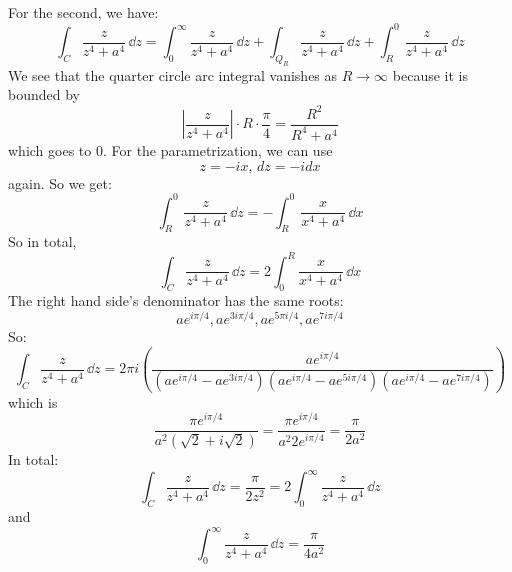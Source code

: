 \documentclass{article}
\begin{document}
\begin{answer}
            For the second, we have:
                \begin{equation*}
                    \int_{C}^{} \dfrac{z}{z^{4} + a^{4}} \, \dd{z} = \int_{0}^{\infty} \dfrac{z}{z^{4} + a^{4}} \, \dd{z}  + \int_{Q_{R}}^{} \dfrac{z}{z^{4} + a^{4}} \, \dd{z}  + \int_{R}^{0} \dfrac{z}{z^{4} + a^{4}} \, \dd{z} 
                \end{equation*}
            We see that the quarter circle arc integral vanishes as $R \rightarrow\infty$ because it is bounded by
                \begin{equation*}
                    \left\lvert \dfrac{z}{z^{4} + a^{4}} \right\rvert \cdot R \cdot \dfrac{\pi}{4} = \dfrac{R^{2}}{R^{4} + a^{4}}
                \end{equation*}
            which goes to $0$. For the parametrization, we can use
                \begin{equation*}
                    z = -ix, \, dz = -id x
                \end{equation*}
            again. So we get:
                \begin{equation*}
                    \int_{R}^{0} \dfrac{z}{z^{4} + a^{4}} \, \dd{z} = -\int_{R}^{0} \dfrac{x}{x^{4} + a^{4}} \, \dd{x} 
                \end{equation*}
            So in total,
                \begin{equation*}
                    \int_{C}^{} \dfrac{z}{z^{4} + a^{4}} \, \dd{z}  = 2\int_{0}^{R} \dfrac{x}{x^{4} + a^{4}} \, \dd{x} 
                \end{equation*}
            The right hand side's denominator has the same roots:
                \begin{equation*}
                    ae^{i\pi/4}, ae^{3i \pi/4}, ae^{5\pi i / 4}, ae^{7i \pi/4}
                \end{equation*}
            So:
                \begin{equation*}
                    \int_{C}^{} \dfrac{z}{z^{4} + a^{4}} \, \dd{z}  = 2\pi i (\dfrac{ae^{i\pi/4}}{(ae^{i\pi/4} - ae^{3i\pi/4})(ae^{i\pi/4} - ae^{5i\pi/4})(ae^{i\pi/4} - ae^{7i\pi/4})})
                \end{equation*}
            which is 
                \begin{equation*}
                    \dfrac{\pi e^{i\pi/4}}{a^{2}(\sqrt{2} + i\sqrt{2})} = \dfrac{\pi e^{i\pi/4}}{a^{2}2e^{i\pi/4}} = \dfrac{\pi}{2a^{2}}
                \end{equation*}
            In total:
                \begin{equation*}
                    \int_{C}^{} \dfrac{z}{z^{4} + a^{4}} \, \dd{z}  = \dfrac{\pi}{2z^{2}} = 2 \int_{0}^{\infty} \dfrac{z}{z^{4} + a^{4}} \, \dd{z} 
                \end{equation*}
            and
                \begin{equation*}
                    \int_{0}^{\infty} \dfrac{z}{z^{4} + a^{4}} \, \dd{z}  = \dfrac{\pi}{4a^{2}}
                \end{equation*}
        \end{answer}
\end{document}
